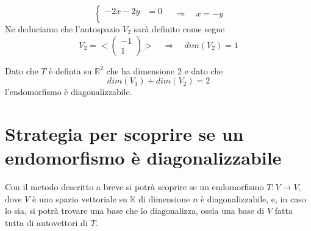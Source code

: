 \begin{example}
\begin{itemize}
		      \[
			      \begin{cases}
				      -2x - 2y & = 0 \\
			      \end{cases} \quad \Rightarrow \quad
			      x = -y
		      \]
		      Ne deduciamo che l'autospazio $V_2$ sar\`a definito come segue
		      \[
			      V_2 = < \begin{pmatrix} -1 \\ 1 \end{pmatrix} > \quad \Rightarrow \quad
			      dim(V_2) = 1
		      \]
	\end{itemize}
	Dato che $T$ \`e definta su $\mathbb{R}^2$ che ha dimensione 2 e dato che
	\[ dim(V_1) + dim(V_2) = 2 \] l'endomorfismo \`e diagonalizzabile.
\end{example}


\section{Strategia per scoprire se un endomorfismo \`e diagonalizzabile}
Con il metodo descritto a breve si potr\`a scoprire se un endomorfismo
$T : V \to V$, dove $V$ \`e uno spazio vettoriale su $\mathbb{K}$ di dimensione $n$
\`e diagonalizzabile, e, in caso lo sia, si potr\`a trovare una base che lo diagonalizza,
ossia una base di $V$ fatta tutta di autovettori di $T$.

